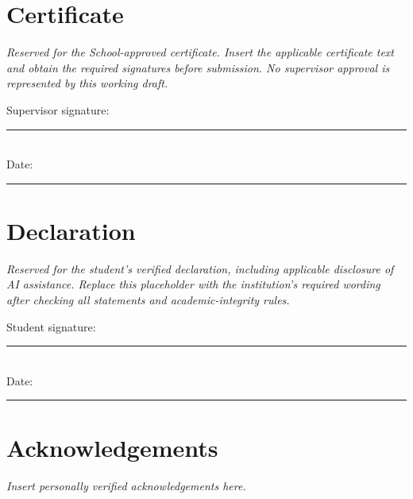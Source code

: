 \chapter*{Certificate}
\textit{Reserved for the School-approved certificate. Insert the applicable
certificate text and obtain the required signatures before submission. No
supervisor approval is represented by this working draft.}

\vfill
\noindent Supervisor signature: \rule{6cm}{0.4pt}\\[1cm]
Date: \rule{4cm}{0.4pt}
\clearpage
\chapter*{Declaration}
\textit{Reserved for the student's verified declaration, including applicable
disclosure of AI assistance. Replace this placeholder with the institution's
required wording after checking all statements and academic-integrity rules.}

\vfill
\noindent Student signature: \rule{6cm}{0.4pt}\\[1cm]
Date: \rule{4cm}{0.4pt}
\clearpage
\chapter*{Acknowledgements}
\textit{Insert personally verified acknowledgements here.}
\clearpage
